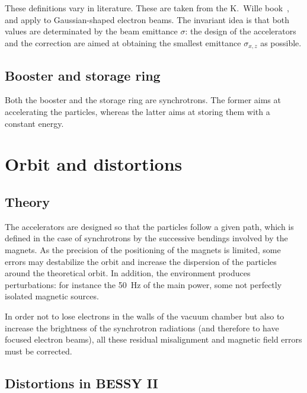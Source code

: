 These definitions vary in literature. These are taken from the K.~Wille book~\cite{book:wille}, and apply to Gaussian-shaped electron beams. The invariant idea is that both values are determinated by the beam emittance $\sigma$: the design of the accelerators and the correction are aimed at obtaining the smallest emittance $\sigma_{x,z}$ as possible.
\subsection{Booster and storage ring}
Both the booster and the storage ring are synchrotrons. The former aims at accelerating the particles, whereas the latter aims at storing them with a constant energy. 

\section{Orbit and distortions}
\subsection{Theory}
The accelerators are designed so that the particles follow a given path, which is defined in the case of synchrotrons by the successive bendings involved by the magnets. As the precision of the positioning of the magnets is limited, some errors may destabilize the orbit and increase the dispersion of the particles around the theoretical orbit. In addition, the environment produces perturbations: for instance the 50~Hz of the main power, some not perfectly isolated magnetic sources.

In order not to lose electrons in the walls of the vacuum chamber but also to increase the brightness of the synchrotron radiations (and therefore to have focused electron beams), all these residual misalignment and magnetic field errors must be corrected.

\subsection{Distortions in BESSY II}


